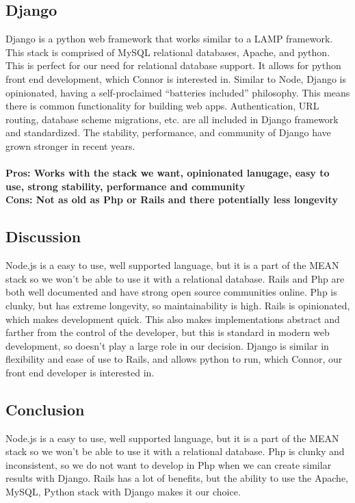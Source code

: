 \documentclass[draftclsnofoot,onecolumn,letterpaper,10pt,compsoc]{IEEEtran}
\begin{document}
\subsection{Django}
		Django is a python web framework that works similar to a LAMP framework.
		This stack is comprised of MySQL relational databases, Apache, and python\cite{Bitnami}.
		This is perfect for our need for relational database support. It allows for python front end development, which Connor is interested in.
		Similar to Node, Django is opinionated, having a self-proclaimed “batteries included” philosophy\cite{FullStackPython}.
		This means there is common functionality for building web apps. Authentication, URL routing, database scheme migrations, etc. are all included in Django framework and standardized\cite{FullStackPython}.
		The stability, performance, and community of Django have grown stronger in recent years\cite{FullStackPython}.
		\\ \\
		\textbf{Pros: Works with the stack we want, opinionated lanugage, easy to use, strong stability, performance and community }
		\\
		\textbf{Cons: Not as old as Php or Rails and there potentially less longevity}

		\subsection{Discussion}
		Node.js is a easy to use, well supported language, but it is a part of the MEAN stack so we won’t be able to use it with a relational database.
		Rails and Php are both well documented and have strong open source communities online.
		Php is clunky, but has extreme longevity, so maintainability is high.
		Rails is opinionated, which makes development quick.
		This also makes implementations abstract and farther from the control of the developer, but this is standard in modern web development, so doesn't play a large role in our decision.
		Django is similar in flexibility and ease of use to Rails, and allows python to run, which Connor, our front end developer is interested in.

		\subsection{Conclusion}
		Node.js is a easy to use, well supported language, but it is a part of the MEAN stack so we won’t be able to use it with a relational database.
		Php is clunky and inconsistent, so we do not want to develop in Php when we can create similar results with Django.
		Rails has a lot of benefits, but the ability to use the Apache, MySQL, Python stack with Django makes it our choice.

\clearpage

{}

\end{document}
